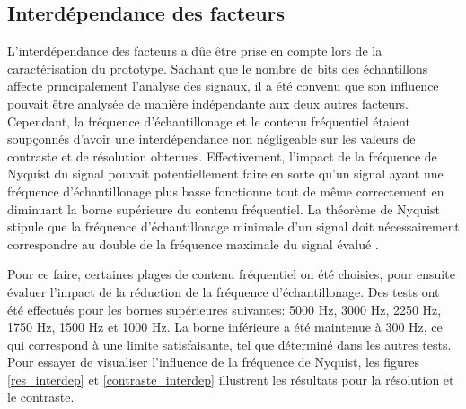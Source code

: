 \documentclass[11pt,letterpaper]{article}
\begin{document}
\subsection{Interdépendance des facteurs}
L'interdépendance des facteurs a dûe être prise en compte lors de la caractérisation du prototype. Sachant que le nombre
de bits des échantillons affecte principalement l'analyse des signaux, il a été convenu que son influence pouvait être analysée
de manière indépendante aux deux autres facteurs. Cependant, la fréquence d'échantillonage et le contenu fréquentiel étaient soupçonnés
d'avoir une interdépendance non négligeable sur les valeurs de contraste et de résolution obtenues. Effectivement, l'impact de la fréquence
de Nyquist du signal pouvait potentiellement faire en sorte qu'un signal ayant une fréquence d'échantillonage plus basse fonctionne tout de même 
correctement en diminuant la borne supérieure du contenu fréquentiel. La théorème de Nyquist stipule que la fréquence d'échantillonage
minimale d'un signal doit nécessairement correspondre au double de la fréquence maximale du signal évalué \cite{nyquist}. 

Pour ce faire, certaines plages de contenu fréquentiel on été choisies, pour ensuite évaluer l'impact de la réduction de la fréquence 
d'échantillonage. Des tests ont été effectués pour les bornes supérieures suivantes: 5000 Hz, 3000 Hz, 2250 Hz, 1750 Hz, 1500 Hz et 1000 Hz.
La borne inférieure a été maintenue à 300 Hz, ce qui correspond à une limite satisfaisante, tel que déterminé dans les autres tests. Pour essayer de visualiser
l'influence de la fréquence de Nyquist, les figures \ref{res_interdep} et \ref{contraste_interdep} illustrent les résultats pour la résolution et le contraste.
\end{document}
